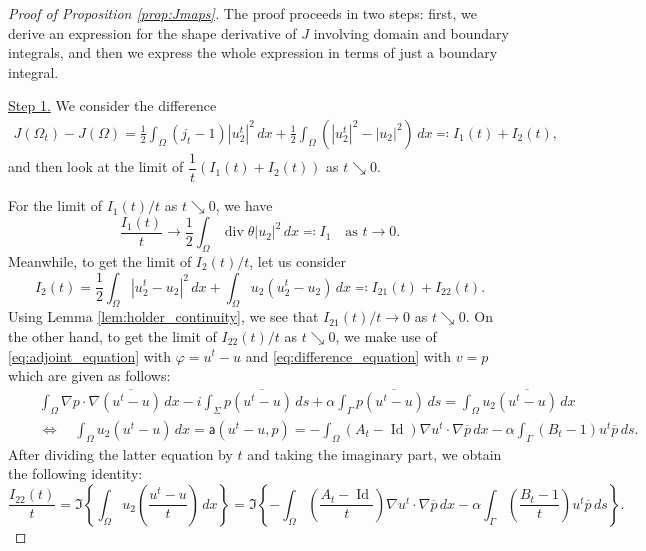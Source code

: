 \documentclass[a4paper,11pt]{article}
\newcommand{\dive}{\operatorname{div}}
\newcommand{\ui}{u_{2}}
\newcommand{\Id}{\operatorname{Id}}
\newcommand{\Jact}{j_{t}}
\newcommand{\aaa}{{\mathsf{a}}}
\newcommand{\VV}{\theta}
\newcommand{\intO}[1]{\int_{\varOmega}{#1}{\, {d}{x}}}
\newcommand{\intOt}[1]{\int_{\varOmega_t}{#1}{\, {d}{x}_t}}
\newcommand{\intS}[1]{\int_{\varSigma}{#1}{\, {d}{s}}}
\newcommand{\intG}[1]{\int_{\varGamma}{#1}{\, {d}{s}}}
\begin{document}
\begin{proof}[Proof of Proposition \ref{prop:Jmaps}]
	The proof proceeds in two steps: first, we derive an expression for the shape derivative of $J$ involving domain and boundary integrals, and then we express the whole expression in terms of just a boundary integral. 
	
	\underline{Step 1.} We consider the difference
	\begin{align*}
		J(\varOmega_{t}) - J(\varOmega) 
		= \frac12 \intO{ ({\Jact} - 1) |\ui^{t}|^{2} } + \frac12 \intO{ (|\ui^{t}|^{2} - |\ui|^{2})}
		\eqqcolon I_{1}(t) + I_{2}(t),
	\end{align*}
	and then look at the limit of $\dfrac{1}{t}\left(I_{1}(t) + I_{2}(t)\right)$ as $t \searrow 0$.
	
	For the limit of $I_{1}(t)/t$ as $t \searrow 0$, we have
	\begin{equation}\label{expression1}
		\frac{I_{1}(t)}{t}  \longrightarrow \frac12 \intO{ \dive \VV |\ui|^{2} } \eqqcolon I_{1} \quad \text{as $t \longrightarrow 0$}.
	\end{equation}
	Meanwhile, to get the limit of $I_{2}(t)/t$, let us consider
	\[
		I_{2}(t) = \frac12 \intO{ |\ui^{t} - \ui|^{2}} + \intO{ \ui (\ui^{t} - \ui)}
			\eqqcolon I_{21}(t) + I_{22}(t).
	\]
	Using Lemma \ref{lem:holder_continuity}, we see that $I_{21}(t)/t \to 0$ as $t \searrow 0$.
	On the other hand, to get the limit of $I_{22}(t)/t$ as $t \searrow 0$, we make use of \eqref{eq:adjoint_equation} with $\varphi = u^{t} - u$ and \eqref{eq:difference_equation} with $v = p$ which are given as follows: 
	\[
	\begin{aligned}
		&\intO{\nabla p \cdot \nabla \overline{(u^{t} - u)}} - i \intS{p \overline{(u^{t} - u)}} + \alpha \intG{p \overline{(u^{t} - u)}} = \intO{ \ui \overline{(u^{t} - u)} }\\
		\quad& \Longleftrightarrow \quad 
		\intO{ \ui (u^{t} - u) }
		= \aaa(u^{t} - u,{p}) 
		= - \intO{(A_{t} - \Id) \nabla {u^{t}} \cdot \nabla \overline{p}} - \alpha \intG{ (B_{t} - 1) {u^{t}} \overline{p}}.	
	\end{aligned}
	\]
	After dividing the latter equation by $t$ and taking the imaginary part, we obtain the following identity:
	\[
	\frac{I_{22}(t)}{t} = \Im \left\{ \intO{ \ui \left(\frac{u^{t} - u}{t}\right) }  \right\}
	= \Im\left\{ - \intO{\left(\frac{A_{t} - \Id}{t}\right) \nabla {u^{t}} \cdot \nabla \overline{p}} - \alpha \intG{ \left(\frac{B_{t} - 1}{t}\right) {u^{t}} \overline{p}} \right\}.
	\]
	

\end{proof}
\end{document}
